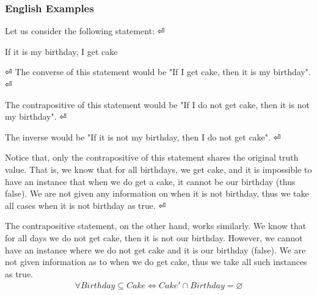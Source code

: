 \documentclass[a4paper]{article}
\theoremstyle{plain}
\theoremstyle{definition}
\newtheorem{exmp}{Example}[section]
\theoremstyle{remark}
\begin{document}
\subsubsection{English Examples}
\begin{tcolorbox}[colback=black!3!white,colframe=black!60!white,title=\begin{exmp}English Example \label{English Example}\end{exmp}]
Let us consider the following statement: ⏎
\begin{center}
	If it is my birthday, I get cake
\end{center} ⏎
The converse of this statement would be "If I get cake, then it is my birthday". ⏎

The contrapositive of this statement would be "If I do not get cake, then it is not my birthday".     ⏎

The inverse would be "If it is not my birthday, then I do not get cake". ⏎ 

Notice that, only the contrapositive of this statement shares the original truth value. That is,  we know that for all birthdays, we get cake, and it is impossible to have an instance that when we do get a cake, it cannot be our birthday (thus false). We are not given any information on when it is not birthday, thus we take all cases when it is not birthday as true. ⏎

The contrapositive statement, on the other hand, works similarly. We know that for all days we do not get cake, then it is not our birthday. However, we cannot have an instance where we do not get cake and it is our birthday (false). We are not given information as to when we do get cake, thus we take all such instances as true.
\begin{align*}
	\forall Birthday \subseteq Cake \iff Cake' \cap Birthday = \varnothing
\end{align*}
\end{tcolorbox}
\end{document}
